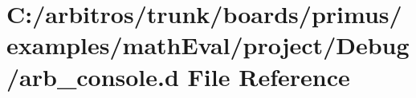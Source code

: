 \hypertarget{boards_2primus_2examples_2math_eval_2project_2_debug_2arb__console_8d}{\section{C\-:/arbitros/trunk/boards/primus/examples/math\-Eval/project/\-Debug/arb\-\_\-console.d File Reference}
\label{boards_2primus_2examples_2math_eval_2project_2_debug_2arb__console_8d}
}
